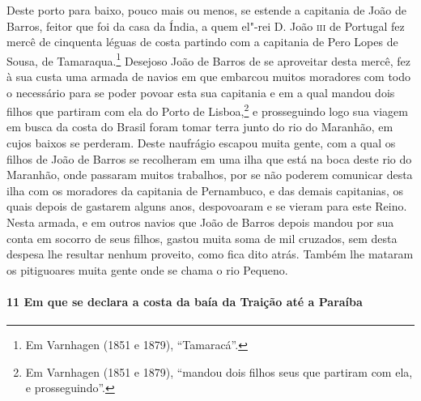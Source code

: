 Deste porto para baixo, pouco mais ou menos, se estende a capitania de João de Barros,
feitor que foi da casa da Índia, a quem el"-rei D. João \textsc{iii} de Portugal fez mercê
de cinquenta léguas de costa partindo com a capitania de Pero Lopes de Sousa, de
Tamaraqua.\footnote{ Em Varnhagen (1851 e 1879), ``Tamaracá''.} Desejoso João de Barros de
se aproveitar desta mercê, fez à sua custa uma armada de navios em que embarcou muitos
moradores com todo o necessário para se poder povoar esta sua capitania e em a qual mandou
dois filhos que partiram com ela do Porto de Lisboa,\footnote{ Em Varnhagen (1851 e 1879),
``mandou dois filhos seus que partiram com ela, e prosseguindo''.} e prosseguindo logo sua
viagem em busca da costa do Brasil foram tomar terra junto do rio do Maranhão, em cujos
baixos se perderam. Deste naufrágio escapou muita gente, com a qual os filhos de João de
Barros se recolheram em uma ilha que está na boca deste rio do Maranhão, onde passaram
muitos trabalhos, por se não poderem comunicar desta ilha com os moradores da capitania de
Pernambuco, e das demais capitanias, os quais depois de gastarem alguns anos, despovoaram
e se vieram para este Reino. Nesta armada, e em outros navios que João de Barros depois
mandou por sua conta em socorro de seus filhos, gastou muita soma de mil cruzados, sem
desta despesa lhe resultar nenhum proveito, como fica dito atrás. Também lhe mataram os
pitiguoares muita gente onde se chama o rio Pequeno.

\paragraph{11 Em que se declara a costa da baía da Traição até a Paraíba}

